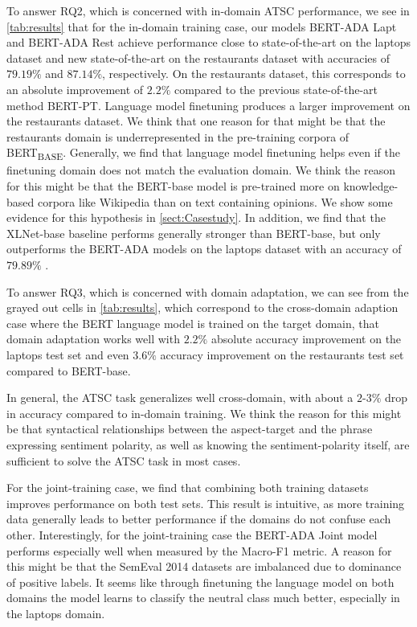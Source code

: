 \documentclass[11pt,a4paper]{article}
\begin{document}
To answer RQ2, which is concerned with in-domain ATSC performance, we see in \autoref{tab:results} that for the in-domain training case, our models BERT-ADA Lapt and BERT-ADA Rest achieve performance close to state-of-the-art on the laptops dataset and new state-of-the-art on the restaurants dataset with accuracies of $79.19\%$ and $87.14\%$, respectively. On the restaurants dataset, this corresponds to an absolute improvement of $2.2\%$ compared to the previous state-of-the-art method BERT-PT.
Language model finetuning produces a larger improvement on the restaurants dataset. We think that one reason for that might be that the restaurants domain is underrepresented in the pre-training corpora of BERT\textsubscript{BASE}.
Generally, we find that language model finetuning helps even if the finetuning domain does not match the evaluation domain. We think the reason for this might be that the BERT-base model is pre-trained more on knowledge-based corpora like Wikipedia than on text containing opinions. We show some evidence for this hypothesis in \autoref{sect:Casestudy}.
In addition, we find that the XLNet-base baseline performs generally stronger than BERT-base, but only outperforms the BERT-ADA models on the laptops dataset with an accuracy of $79.89\%$ .

To answer RQ3, which is concerned with domain adaptation, we can see from the grayed out cells in \autoref{tab:results}, which
correspond to the cross-domain adaption case where the BERT language model is trained on the target domain, that domain adaptation works well with $2.2\%$ absolute accuracy improvement on the laptops test set and even $3.6\%$ accuracy improvement on the restaurants test set compared to BERT-base.

In general, the ATSC task generalizes well cross-domain, with about a $2$-$3\%$ drop in accuracy compared to in-domain training. We think the reason for this might be 
that syntactical relationships between the aspect-target and the phrase expressing sentiment polarity, as well as knowing the sentiment-polarity itself, are sufficient to solve the ATSC task in most cases.

For the joint-training case, we find that combining both training datasets improves performance on both test sets.
This result is intuitive, as more training data generally leads to better performance if the domains do not confuse each other.
Interestingly, for the joint-training case the BERT-ADA Joint model
performs especially well when measured by the Macro-F1 metric. A reason for this 
might be that the SemEval 2014 datasets are imbalanced due to dominance of positive labels. 
It seems like through finetuning the language model on both domains the model learns to classify the neutral class much better, especially in the laptops domain.
\end{document}

